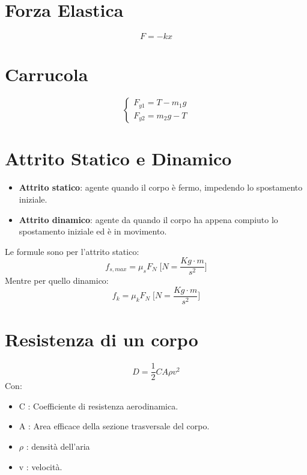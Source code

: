     \section*{Forza Elastica}
        \begin{equation*}
            F = -kx
        \end{equation*}

    \section*{Carrucola}
        \begin{equation*}
            \begin{cases}
                F_{y1} = T - m_1g \\
                F_{y2} = m_2g - T
            \end{cases}
        \end{equation*}

    \section*{Attrito Statico e Dinamico}
        \begin{itemize}
            \item \textbf{Attrito statico}: agente quando il corpo è fermo, 
            impedendo lo spostamento iniziale.
            \item \textbf{Attrito dinamico}: agente da quando il corpo ha 
            appena compiuto lo spostamento iniziale ed è in movimento.
        \end{itemize}
    Le formule sono per l'attrito statico:
        \begin{equation*}
            f_{s, max} = \mu_sF_N \;\Bigg[N = \frac{Kg \cdot m} {s^2} \Bigg]
        \end{equation*}
        Mentre per quello dinamico:
        \begin{equation*}
            f_{k} = \mu_kF_N \;\Bigg[N = \frac{Kg \cdot m} {s^2} \Bigg]
        \end{equation*}
    
    \section*{Resistenza di un corpo}
        \begin{equation*}
            D = \frac{1}{2}CA\rho v^2
        \end{equation*}
        Con:
        \begin{itemize}
            \item C : Coefficiente di resistenza aerodinamica.
            \item A : Area efficace della sezione trasversale del corpo.
            \item $\rho$ : densità dell'aria
            \item v : velocità.
        \end{itemize}

